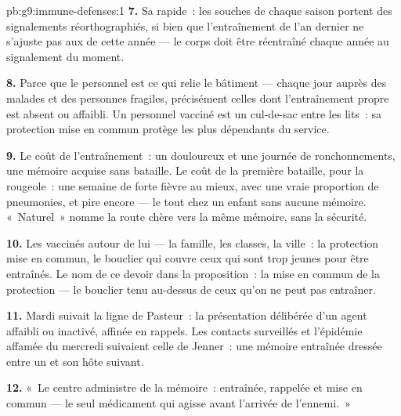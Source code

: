 \begin{solution}{pb:g9:immune-defenses:1}
\textbf{7.} Sa  rapide~: les souches de chaque
saison portent des signalements réorthographiés, si bien que
l'entraînement de l'an dernier ne s'ajuste pas aux 
de cette année --- le corps doit être réentraîné chaque
année au signalement du moment.

\textbf{8.} Parce que le personnel est ce qui relie le
bâtiment --- chaque jour auprès des malades et des personnes
fragiles, précisément celles dont l'entraînement propre est
absent ou affaibli. Un personnel vacciné est un cul-de-sac
entre les lits~: sa protection mise en commun protège les
plus dépendants du service.

\textbf{9.} Le coût de l'entraînement~: un  douloureux
et une journée de ronchonnements, une mémoire acquise sans
bataille. Le coût de la première bataille, pour la rougeole~:
une semaine de forte fièvre au mieux, avec une vraie
proportion de pneumonies, et pire encore --- le tout chez un
enfant sans aucune mémoire. «~Naturel~» nomme la route chère
vers la même mémoire, sans la sécurité.

\textbf{10.} Les vaccinés autour de lui --- la famille, les
classes, la ville~: la protection mise en commun, le
bouclier qui couvre ceux qui sont trop jeunes pour être
entraînés. Le nom de ce devoir dans la proposition~: la mise
en commun de la protection --- le bouclier tenu au-dessus de
ceux qu'on ne peut pas entraîner.

\textbf{11.} Mardi suivait la ligne de Pasteur~: la
présentation délibérée d'un agent affaibli ou inactivé,
affinée en rappels. Les contacts surveillés et l'épidémie
affamée du mercredi suivaient celle de Jenner~: une mémoire
entraînée dressée entre un  et son hôte suivant.

\textbf{12.} «~Le centre administre de la mémoire~:
entraînée, rappelée et mise en commun --- le seul médicament
qui agisse avant l'arrivée de l'ennemi.~»
\end{solution}
